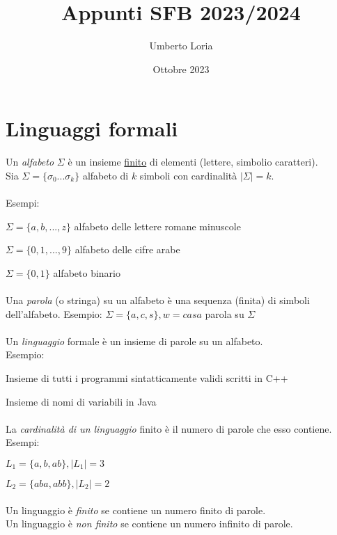 \documentclass[]{article}
\title{Appunti SFB 2023/2024}
\author{Umberto Loria}
\date{Ottobre 2023}
\begin{document}
\begin{titlepage}
\maketitle
\end{titlepage}

\tableofcontents{}
\newpage
\section{Linguaggi formali}

Un \textit{alfabeto} \mbox{$\Sigma$} è un insieme \underline{finito} di elementi (lettere, simbolio caratteri).
\\
Sia \mbox{$\Sigma=\{\sigma_0 ... \sigma_k\}$} alfabeto di \begin{math}k\end{math} simboli con cardinalità \mbox{$|\Sigma|=k$}.
\\
\\
Esempi:

\mbox{$\Sigma=\{a, b, ..., z\}$} alfabeto delle lettere romane minuscole

\mbox{$\Sigma=\{0, 1, ..., 9\}$} alfabeto delle cifre arabe

\mbox{$\Sigma=\{0, 1\}$} alfabeto binario
\\
\\
Una \textit{parola} (o stringa) su un alfabeto è una sequenza (finita) di simboli dell'alfabeto.
Esempio: \mbox{$\Sigma = \{a, c, s\}, w = casa$} parola su \mbox{$\Sigma$}
\\
\\
Un \textit{linguaggio} formale è un insieme di parole su un alfabeto.
\\
Esempio:

Insieme di tutti i programmi sintatticamente validi scritti in C++

Insieme di nomi di variabili in Java
\\
\\
La \textit{cardinalità di un linguaggio} finito è il numero di parole che esso contiene.
Esempi:

\mbox{$L_1=\{a, b, ab\}, |L_1|=3$}

\mbox{$L_2=\{aba, abb\}, |L_2|=2$}
\\
\\
Un linguaggio è \textit{finito} se contiene un numero finito di parole.
\\
Un linguaggio è \textit{non finito} se contiene un numero infinito di parole.
\end{document}
